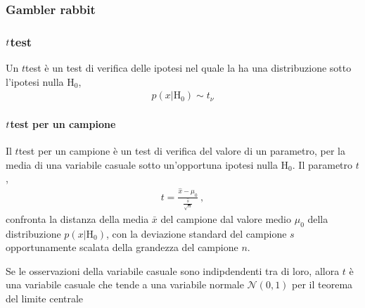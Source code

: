 \documentclass[letterpaper,10pt,italian]{jupyterBook}
\begin{document}
\subsubsection{Gambler rabbit}
\label{\detokenize{ch/statistics/test-fisher-rabbit:gambler-rabbit}}\label{\detokenize{ch/statistics/test-fisher-rabbit::doc}}
\sphinxstepscope


\subsubsection{\protect\(t\protect\)\sphinxhyphen{}test}
\label{\detokenize{ch/statistics/t-test:t-test}}\label{\detokenize{ch/statistics/t-test::doc}}


\sphinxAtStartPar
Un \(t\)\sphinxhyphen{}test è un test di verifica delle ipotesi nel quale la  ha una distribuzione  sotto l’ipotesi nulla \(\text{H}_0\),
\begin{equation*}
\begin{split}p(x|\text{H}_0) \sim t_{\nu}\end{split}
\end{equation*}

\paragraph{\protect\(t\protect\)\sphinxhyphen{}test per un campione}
\label{\detokenize{ch/statistics/t-test:t-test-per-un-campione}}
\sphinxAtStartPar
Il \(t\)\sphinxhyphen{}test per un campione è un test di verifica del valore di un parametro, per la media di una variabile casuale sotto un’opportuna ipotesi nulla \(\text{H}_0\). Il parametro \(t\),
\begin{equation*}
\begin{split}t = \frac{\hat{x} - \mu_0}{\frac{\hat{s}}{\sqrt{n}}} \ ,\end{split}
\end{equation*}
\sphinxAtStartPar
confronta la distanza della media \(\bar{x}\) del campione dal valore medio \(\mu_0\) della distribuzione \(p(x|\text{H}_0)\), con la deviazione standard del campione \(s\) opportunamente scalata della grandezza del campione \(n\).

\sphinxAtStartPar
Se le osservazioni della variabile casuale sono indipdendenti tra di loro, allora \(t\) è una variabile casuale che tende a una variabile normale \(\mathscr{N}(0,1)\) per il teorema del limite centrale  
\end{document}
